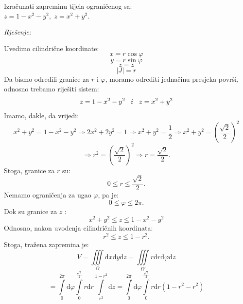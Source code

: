 \documentclass[a4paper,11pt]{article}
\begin{document}
\begin{tcolorbox}[colback=brown!35!white,colframe=white!75!white,title= $$\bullet \bullet \bullet$$]
         \begin{zadatak}
Izračunati zapreminu tijela ograničenog sa:\\
$  z= 1 - x^2 - y^2  ,$ $z  =  x^2 + y^2  .$
\end{zadatak}
\end{tcolorbox}
\emph{Rješenje: }
\begin{center}
\end{center}
Uvedimo cilindrične koordinate:
$$x= r\cos{\varphi}$$
$$y= r\sin{\varphi}$$
$$z=z$$
$$|J|= r$$
Da bismo odredili granice za $r$ i $\varphi$, moramo odrediti jednačinu presjeka površi, odnosno trebamo riješiti sistem:
$$z= 1 - x^2 - y^2 \hspace{0.3 cm} i \hspace{0.3 cm} z  =  x^2 + y^2   $$
Imamo, dakle, da vrijedi:
$$x^2 + y^2  =  1 - x^2 - y^2 \Rightarrow 2x^2 + 2y^2  = 1 \Rightarrow x^2 + y^2 = \frac{1}{2} \Rightarrow x^2 + y^2 =   \left(\frac{\sqrt{2}}{2}\right)^2$$
$$\Rightarrow r^2 =\left(\frac{\sqrt{2}}{2}\right)^2 \Rightarrow r = \frac{\sqrt{2}}{2}.  $$
Stoga, granice za $r$ su:
$$0\leq r \leq \frac{\sqrt{2}}{2}.$$
Nemamo ograničenja za ugao $\varphi$, pa je:
$$0\leq \varphi \leq 2\pi.$$
Dok su granice za $z$ :
$$x^2 + y^2\leq z \leq 1 - x^2 - y^2$$
Odnosno, nakon uvođenja cilindričnih koordinata:
$$r^2\leq z \leq 1 -r^2.$$
Stoga, tražena zapremina je:
$$V =\iiint \limits_{\Omega}    \mathrm dx \mathrm dy \mathrm dz = \iiint \limits_{\Omega'}    r \mathrm dr \mathrm d\varphi \mathrm dz $$
$$= \int\limits_{0}^{2\pi} \mathrm d\varphi \int\limits_{0}^{\frac{\sqrt{2}}{2}} r\mathrm dr \int\limits_{  r^2 }^{   1 - r^2 }   \mathrm dz=  \int\limits_{0}^{2\pi} \mathrm d\varphi \int\limits_{0}^{\frac{\sqrt{2}}{2} } r\mathrm dr(1-r^2 - r^2)  $$
\end{document}
